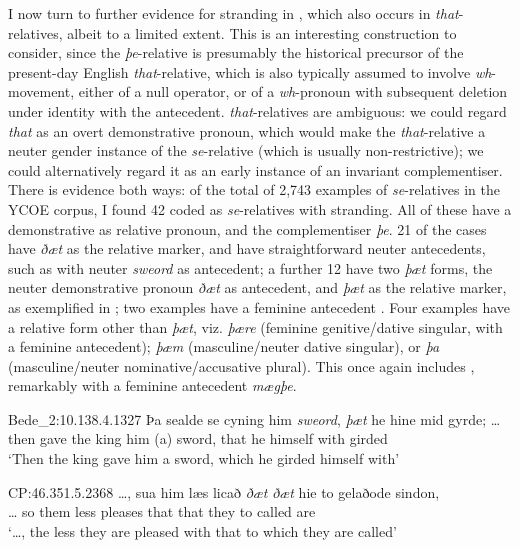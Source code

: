 \documentclass[output=paper]{langsci/langscibook}
\begin{document}
I now turn to further evidence for stranding in , which also occurs
in \textit{that}-relatives, albeit to a limited extent. This is an interesting
construction to consider, since the \textit{þe}-relative is presumably the
historical precursor of the present-day English \textit{that}-relative, which
is also typically assumed to involve \textit{wh}-movement, either of a null
operator, or of a \textit{wh}-pronoun with subsequent deletion under identity
with the antecedent.  \textit{that}-relatives are ambiguous: we
could regard \textit{that} as an overt demonstrative pronoun, which would make
the \textit{that}-relative a neuter gender instance of the \textit{se}-relative
(which is usually non-restrictive); we could alternatively regard it as an
early instance of an invariant complementiser. There is evidence both ways: of
the total of 2,743 examples of \textit{se}-relatives in the YCOE corpus, I
found 42 coded as \textit{se}-relatives with stranding. All of these have a
demonstrative as relative pronoun, and the complementiser \textit{þe}.  21 of
the cases have \textit{ðæt} as the relative marker, and have straightforward
neuter antecedents, such as  with neuter \textit{sweord} as
antecedent; a further 12 have two \textit{þæt} forms, the neuter demonstrative
pronoun \textit{ðæt} as antecedent, and \textit{þæt} as the relative marker, as
exemplified in ; two examples have a feminine antecedent
. Four examples have a relative form other than \textit{þæt},
viz.  \textit{þære} (feminine genitive/dative singular, with a feminine
antecedent); \textit{þæm} (masculine/neuter dative singular), or \textit{þa}
(masculine/neuter nominative/accusative plural). This once again includes
, remarkably with a feminine antecedent
\textit{mægþe}.\largerpage

\ea Bede\_2:10.138.4.1327%
    \label{ex:key:11.9b}
    \sn
    \gll  Þa     sealde se  cyning him  {}    \textit{sweord}, \textit{þæt} he hine      mid  gyrde; …  \\
        then gave   the king    him (a) sword,   that he himself with girded\\
    \glt ‘Then the king gave him a sword, which he girded himself with’
\z

\ea CP:46.351.5.2368%
    \label{ex:key:11.10}
    \sn
    \gll …, sua him læs    licað    \textit{ðæt} \textit{ðæt} hie  to   gelaðode sindon, \\
        …  so   them less pleases that that they to called      are\\
    \glt `…, the less they are pleased with that to which they are called’
\z
\end{document}
